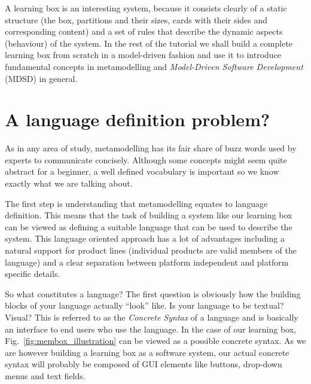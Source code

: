A learning box is an interesting system, because it consists clearly of a static structure (the box, partitions and their sizes, cards with their sides and corresponding content) and a set of rules that describe the dynamic aspects
(behaviour) of the system.
In the rest of the tutorial we shall build a complete learning box from scratch in a model-driven fashion and use it to introduce fundamental concepts in metamodelling and \emph{Model-Driven Software Development} (MDSD) in general.

\section{A language definition problem?}

As in any area of study, metamodelling has its fair share of buzz words used by experts to communicate concisely.  Although some concepts might seem quite abstract for a beginner, a well defined vocabulary is important so we know
exactly what we are talking about.

The first step is understanding that metamodelling equates to language definition.
This means that the task of building a system like our learning box can be viewed as defining a suitable language that can be used to describe the system.
This language oriented approach has a lot of advantages including a natural support for product lines (individual products are valid members of the language) and a clear separation between platform independent and platform specific details.

So what constitutes a language?  The first question is obviously  how the building blocks of your language actually ``look'' like.
Is your language to be textual?  Visual?  This is referred to as the \emph{Concrete Syntax} of a language and is basically an interface to end users who use the language.
In the case of our learning box, Fig.~\ref{fig:membox_illustration} can be viewed as a possible concrete syntax.
As we are however building a learning box as a software system, our actual concrete syntax  will probably be composed of GUI elements like buttons, drop-down menus and text fields.

